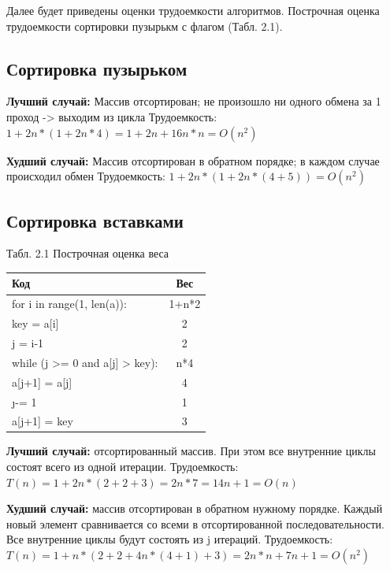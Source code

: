 \documentclass[12pt]{report}
\begin{document}
Далее будет приведены оценки трудоемкости алгоритмов. Построчная оценка трудоемкости сортировки пузырькм с флагом (Табл. 2.1).

\subsection{Сортировка пузырьком}
\textbf{Лучший случай:} Массив отсортирован; не произошло ни одного обмена за 1 проход -> выходим из цикла \newline
Трудоемкость:  $1+2n*(1 + 2n*4) = 1+2n+16n*n=  O(n^{2})$

\textbf{Худший случай:}  Массив отсортирован в обратном порядке; в каждом случае происходил обмен\newline
Трудоемкость: $1+2n*(1 + 2n*(4+5)) = O(n^2)$

\subsection{Сортировка вставками}
\begin{center}
Табл. 2.1 Построчная оценка веса
	\begin{tabular}{|l c|} 
 	\hline
	Код & Вес \\ [0.5ex] 
 	\hline
 	for i in range(1, len(a)): & 1+n*2\\
 	\hline
	key = a[i] & 2\\
	\hline
	j = i-1 & 2\\
	\hline
	while (j >= 0 and a[j] > key): & n*4\\
	\hline
	a[j+1] = a[j] & 4\\
	\hline
	\j -= 1 & 1\\
	\hline
	a[j+1] = key & 3\\
	\hline
	\end{tabular}
\end{center}

\hspace*{5mm}
\textbf{Лучший случай:} отсортированный массив. При этом все внутренние циклы состоят всего из одной итерации.\newline
Трудоемкость: $T(n) = 1 + 2n * (2+2+3)  =  2n * 7 = 14n + 1 = O(n)$

\textbf{Худший случай:} массив отсортирован в обратном нужному порядке. Каждый новый элемент сравнивается со всеми в отсортированной последовательности.
Все внутренние циклы будут состоять из j итераций. \newline
Трудоемкость: $T(n) = 1+n*(2+2+4n*(4+1)+3) = 2n*n+7n+1 =  O(n^{2})$
\end{document}
